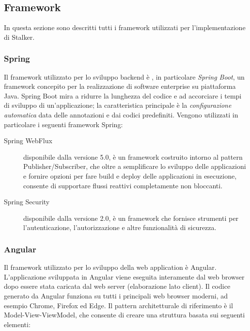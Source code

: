 \documentclass[../../manuale-manutentore.tex]{subfiles}
\begin{document}
\subsection{Framework}%
\label{sub:framework}
In questa sezione sono descritti tutti i framework utilizzati per l'implementazione di Stalker.

\subsubsection{Spring}%
\label{subs:spring}

Il framework utilizzato per lo sviluppo backend è , in particolare \textit{Spring Boot}, un framework concepito per la realizzazione di software enterprise su piattaforma Java.
Spring Boot mira a ridurre la lunghezza del codice e ad accorciare i tempi di sviluppo di un'applicazione; la caratteristica principale è la \textit{configurazione automatica} data delle annotazioni e dai codici predefiniti.
Vengono utilizzati in particolare i seguenti framework Spring:

\begin{description}
  \item[Spring WebFlux] disponibile dalla versione 5.0, è un framework costruito intorno al pattern Publisher/Subscriber, che oltre a semplificare lo sviluppo delle applicazioni e fornire opzioni per fare build e deploy delle applicazioni in esecuzione, consente di supportare flussi reattivi completamente non bloccanti.
  \item[Spring Security] disponibile dalla versione 2.0, è un framework che fornisce strumenti per l'autenticazione, l'autorizzazione e altre funzionalità di sicurezza.
\end{description}

\subsubsection{Angular}%
\label{subs:angular}

Il framework utilizzato per lo sviluppo della web application è Angular.
L'applicazione sviluppata in Angular viene eseguita interamente dal web browser dopo essere stata caricata dal web server (elaborazione lato client).
Il codice generato da Angular funziona su tutti i principali web browser moderni, ad esempio Chrome, Firefox ed Edge.
Il pattern architetturale di riferimento è il Model-View-ViewModel, che consente di creare una struttura basata sui seguenti elementi:
\end{document}
